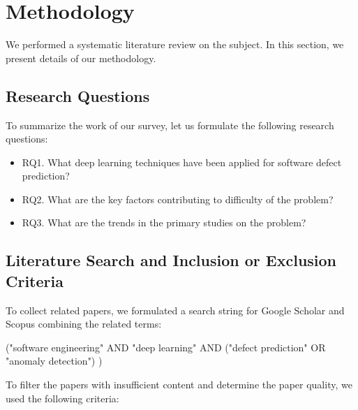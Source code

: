 \documentclass{article}
\begin{document}
\section{Methodology}

We performed a systematic literature review on the subject. In this section, we present details of our methodology.

\subsection{Research Questions}

To summarize the work of our survey, let us formulate the following research questions:

\begin{itemize}
\item RQ1. What deep learning techniques have been applied for software defect prediction?
\item RQ2. What are the key factors contributing to difficulty of the problem?
\item RQ3. What are the trends in the primary studies on the problem?
\end{itemize}

\subsection{Literature Search and Inclusion or Exclusion Criteria}

To collect related papers, we formulated a search string for Google Scholar and Scopus combining the related terms:

("software engineering" AND "deep learning" AND ("defect prediction" OR "anomaly detection") )

To filter the papers with insufficient content and determine the paper quality, we used the following criteria:
\end{document}
